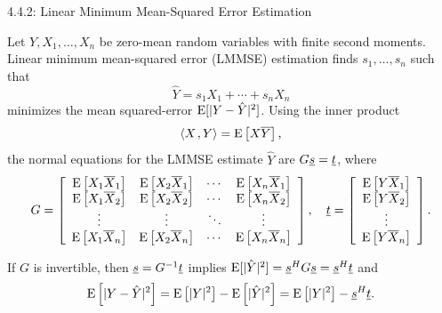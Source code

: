 \documentclass[10pt,english,aspectratio=169]{beamer}
\begin{document}
\begin{frame}{4.4.2: Linear Minimum Mean-Squared Error Estimation}

Let $Y, X_1, \ldots, X_n$ be zero-mean random variables with finite second moments.
Linear minimum mean-squared error (LMMSE) estimation finds $s_1, \ldots, s_n$ such that
\[ \hat{Y} = s_1 X_1 + \cdots + s_n X_n \]
minimizes the mean squared-error $\mathrm{E}[|Y-\hat{Y}|^2]$.
Using the inner product
\begin{equation*}
{\left\langle  X  \mskip2mu ,  Y  \right\rangle} = \mathrm{E} \left[ X \overline{Y} \right],
\end{equation*}
the normal equations for the LMMSE estimate $\hat{Y}$ are $G \underline{s} = \underline{t}$, where
\begin{equation*}
G = \left[ \begin{array}{cccc}
\mathrm{E} \left[ X_1 \overline{X}_1 \right]
& \mathrm{E} \left[ X_2 \overline{X}_1 \right] & \cdots
& \mathrm{E} \left[ X_n \overline{X}_1 \right] \\
\mathrm{E} \left[ X_1 \overline{X}_2 \right]
& \mathrm{E} \left[ X_2 \overline{X}_2 \right] & \cdots
& \mathrm{E} \left[ X_n \overline{X}_2 \right] \\
\vdots & \vdots & \ddots & \vdots \\
\mathrm{E} \left[ X_1 \overline{X}_n \right]
& \mathrm{E} \left[ X_2 \overline{X}_n \right] & \cdots
& \mathrm{E} \left[ X_n \overline{X}_n \right] \\
\end{array} \right], \quad \underline{t} = \left[ \begin{array}{c}
\mathrm{E} \left[ Y \overline{X}_1 \right] \\
\mathrm{E} \left[ Y \overline{X}_2 \right] \\ \vdots \\
\mathrm{E} \left[ Y \overline{X}_n \right] \end{array} \right].
\end{equation*}

If $G$ is invertible, then $\underline{s} = G^{-1} \underline{t}$ implies $\mathrm{E} [|\hat{Y}|^2] = \underline{s}^H G \underline{s} = \underline{s}^H \underline{t}$ and
\begin{equation*}
\mathrm{E}\left[|Y-\hat{Y}|^2\right]
= \mathrm{E}\left[|Y|^2\right]-\mathrm{E}\left[|\hat{Y}|^2\right]
= \mathrm{E}\left[|Y|^2\right]-\underline{s}^H\underline{t}.
\end{equation*}

\end{frame}
\end{document}

